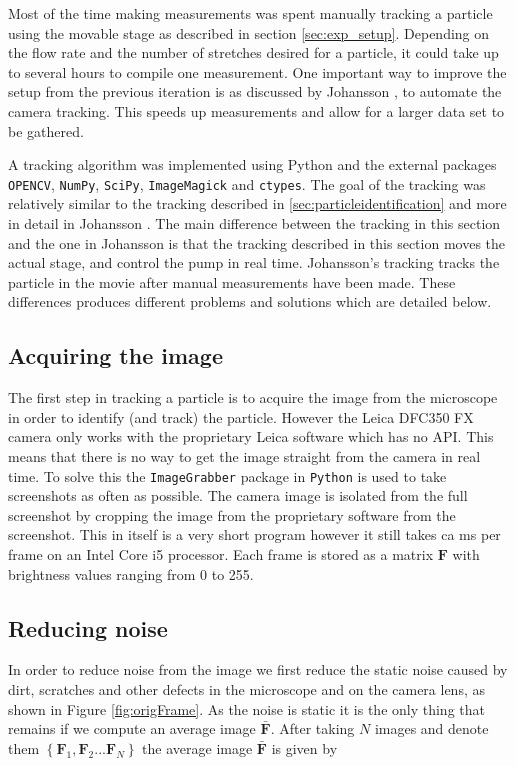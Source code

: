 %
%
%
%
%
\label{sec:tracking}
Most of the time making measurements was spent manually tracking a particle using the movable stage as described in section \ref{sec:exp_setup}. Depending on the flow rate and the number of stretches desired for a particle, it could take up to several hours to compile one measurement. One important way to improve the setup from the previous iteration is as discussed by Johansson \cite{AntonThesis}, to automate the camera tracking. This speeds up measurements and allow for a larger data set to be gathered.

A tracking algorithm was implemented using Python and the external packages \texttt{OPENCV}, \texttt{NumPy}, \texttt{SciPy}, \texttt{ImageMagick} and \texttt{ctypes}. The goal of the tracking was relatively similar to the tracking described in \ref{sec:particleidentification} and more in detail in Johansson \cite{AntonThesis}. The main difference between the tracking in this section and the one in Johansson is that the tracking described in this section moves the actual stage, and control the pump in real time. Johansson's tracking tracks the particle in the movie after manual measurements have been made. These differences produces different problems and solutions which are detailed below. 

\subsection{Acquiring the image}
The first step in tracking a particle is to acquire the image from the microscope in order to identify (and track) the particle. However the Leica DFC350 FX camera only works with the proprietary Leica software which has no API. This means that there is no way to get the image straight from the camera in real time. To solve this the \texttt{ImageGrabber} package in \texttt{Python} is used to take screenshots as often as possible. The camera image is isolated from the full screenshot by cropping the image from the proprietary software from the screenshot. This in itself is a very short program however it still takes ca \unit[50]{ms} per frame on an Intel Core i5 processor. Each frame is stored as a matrix $\mathbf{F}$ with brightness values ranging from 0 to 255.

\subsection{Reducing noise}
In order to reduce noise from the image we first reduce the static noise caused by dirt, scratches and other defects in the microscope and on the camera lens, as shown in Figure \ref{fig:origFrame}. As the noise is static it is the only thing that remains if we compute an average image $\bar{\mathbf{F}}$. After taking $N$ images and denote them $\left\{\mathbf{F}_1,\mathbf{F}_2 ... \mathbf{F}_N \right\}$ the average image $\bar{\mathbf{F}}$ is given by 

